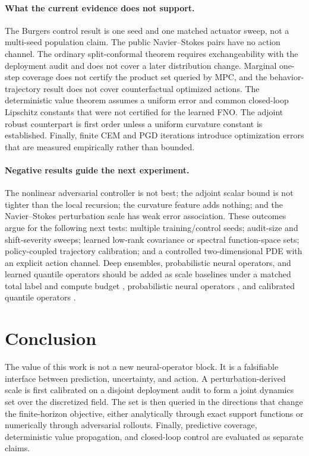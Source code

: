 \documentclass[10pt]{article}
\begin{document}
\paragraph{What the current evidence does not support.}
The Burgers control result is one seed and one matched actuator sweep, not a
multi-seed population claim. The public Navier--Stokes pairs have no action
channel. The ordinary split-conformal theorem requires exchangeability with
the deployment audit and does not cover a later distribution change. Marginal
one-step coverage does not certify the product set queried by MPC, and the
behavior-trajectory result does not cover counterfactual optimized actions.
The deterministic value theorem assumes a uniform error and common
closed-loop Lipschitz constants that were not certified for the learned FNO.
The adjoint robust counterpart is first order unless a uniform curvature
constant is established. Finally, finite CEM and PGD iterations introduce
optimization errors that are measured empirically rather than bounded.

\paragraph{Negative results guide the next experiment.}
The nonlinear adversarial controller is not best; the adjoint scalar bound is
not tighter than the local recursion; the curvature feature adds nothing; and
the Navier--Stokes perturbation scale has weak error association. These outcomes
argue for the following next tests: multiple training/control seeds; audit-size
and shift-severity sweeps; learned low-rank covariance or spectral
function-space sets; policy-coupled trajectory calibration; and a controlled
two-dimensional PDE with an explicit action channel. Deep ensembles,
probabilistic neural operators, and learned quantile operators should be added
as scale baselines under a matched total label and compute budget
\cite{lakshminarayanan2017ensembles}, probabilistic neural operators
\cite{bulte2025probabilistic}, and calibrated quantile operators
\cite{ma2024calibrated}.

\section{Conclusion}

The value of this work is not a new neural-operator block. It is a falsifiable
interface between prediction, uncertainty, and action. A perturbation-derived
scale is first calibrated on a disjoint deployment audit to form a joint
dynamics set over the discretized field. The set is then queried in the
directions that change the finite-horizon objective, either analytically
through exact support functions or numerically through adversarial rollouts.
Finally, predictive coverage, deterministic value propagation, and closed-loop
control are evaluated as separate claims.
\end{document}
